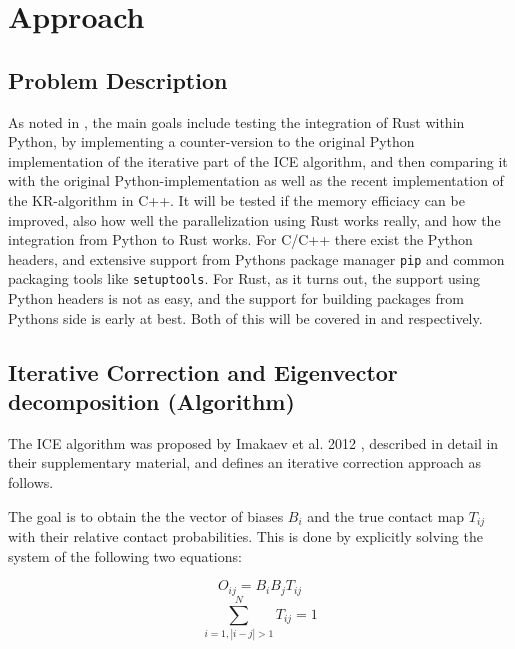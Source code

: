 \chapter{Approach}\label{chap:approach}



\section{Problem Description}\label{sec:problem}

As noted in , the main goals include testing the integration
of Rust within Python, by implementing a counter-version to the original Python
implementation of the iterative part of the ICE algorithm, and then comparing
it with the original Python-implementation as well as the recent implementation
of the KR-algorithm in C++. It will be tested if the memory efficiacy can be
improved, also how well the parallelization using Rust works really, and how
the integration from Python to Rust works. For C/C++ there exist the Python
headers, and extensive support from Pythons package manager \verb|pip| and
common packaging tools like \verb|setuptools|. For Rust, as it turns out, the
support using Python headers is not as easy, and the support for building packages
from Pythons side is early at best. Both of this will be covered in
 and  respectively.



\section{Iterative Correction and Eigenvector decomposition (Algorithm)}\label{sec:ICE}

The ICE algorithm was proposed by Imakaev et al. 2012
\cite{imakaev2012iterative}, described in detail in their supplementary
material, and defines an iterative correction approach as follows.

The goal is to obtain the the vector of biases $B_i$ and the true contact map
$T_{ij}$ with their relative contact probabilities. This is done by explicitly
solving the system of the following two equations:

\begin{equation} \label{eq:1}
O_{ij} = B_i B_j T_{ij}
\end{equation}
\begin{equation} \label{eq:2}
\sum^N_{i=1, |i-j|>1} T_{ij} = 1
\end{equation}

